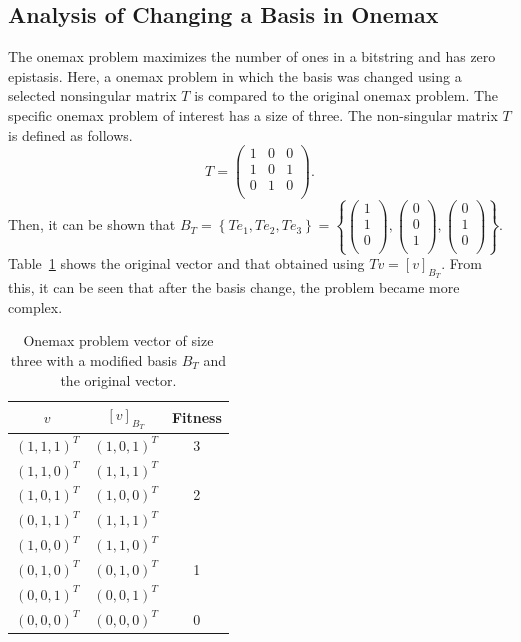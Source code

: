 \subsection{Analysis of Changing a Basis in Onemax}
The onemax problem maximizes the number of ones in a bitstring and has zero epistasis. Here, a onemax problem in which the basis was changed using a selected nonsingular matrix $ T $ is compared to the original onemax problem. The specific onemax problem of interest has a size of three. The non-singular matrix $ T $ is defined as follows.
\begin{equation*}
T=\left(\begin{matrix}1&0&0\\1&0&1\\0&1&0\\\end{matrix}\right).
\end{equation*}
Then, it can be shown that $ B_T=\left\{Te_1,Te_2,Te_3\right\}=\left\{\left(\begin{matrix}1\\1\\0\\\end{matrix}\right),  \left(\begin{matrix}0\\0\\1\\\end{matrix}\right),\left(\begin{matrix}0\\1\\0\\\end{matrix}\right)\right\}$. Table~\ref{tab:onemax} shows the original vector and that obtained using $ Tv=\left[v\right]_{B_T} $. From this, it can be seen that after the basis change, the problem became more complex.
\begin{table}[ht!]
	\caption{Onemax problem vector of size three with a modified basis $ B_T $ and the original vector.} \label{tab:onemax}
	\centering
	\vspace{0.2cm}
	\begin{tabular}{ccc}
		\toprule
		$ v $ & $ \left[v \right]_{B_T} $ & Fitness   \\ 
		\midrule
		$ (1,1,1)^T $ & $ (1,0,1)^T $ & 3   \\ \midrule
		$ (1,1,0)^T $ & $ (1,1,1)^T $ &    \\
		$ (1,0,1)^T $ & $ (1,0,0)^T $ & 2   \\
		$ (0,1,1)^T $ & $ (1,1,1)^T $ &    \\ \midrule
		$ (1,0,0)^T $ & $ (1,1,0)^T $ &    \\
		$ (0,1,0)^T $ & $ (0,1,0)^T $ & 1   \\
		$ (0,0,1)^T $ & $ (0,0,1)^T $ &    \\ \midrule
		$ (0,0,0)^T $ & $ (0,0,0)^T $ & 0   \\
		\bottomrule
	\end{tabular}
\end{table}
